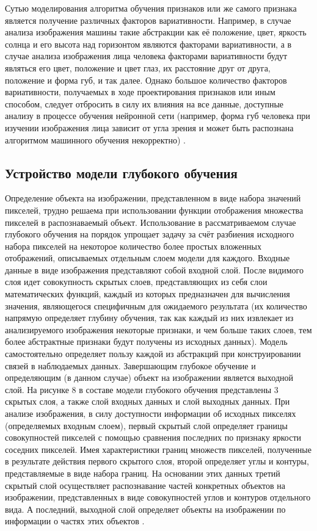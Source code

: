 \documentclass[bachelor, och, coursework]{SCWorks}
\begin{document}
        Сутью моделирования алгоритма обучения признаков или же самого признака является получение различных факторов вариативности. Например, в случае анализа изображения машины такие абстракции как её положение, цвет, яркость солнца и его высота над горизонтом являются факторами вариативности, а в случае анализа изображения лица человека факторами вариативности будут являться его цвет, положение и цвет глаз, их расстояние друг от друга, положение и форма губ, и так далее. Однако большое количество факторов вариативности, получаемых в ходе проектирования признаков или иным способом, следует отбросить в силу их влияния на все данные, доступные анализу в процессе обучения нейронной сети (например, форма губ человека при изучении изображения лица зависит от угла зрения и может быть распознана алгоритмом машинного обучения некорректно) \cite{Gud2}.

    \subsection{Устройство модели глубокого обучения}

        Определение объекта на изображении, представленном в виде набора значений пикселей, трудно решаема при использовании функции отображения множества пикселей в распознаваемый объект. Использование в рассматриваемом случае глубокого обучения на порядок упрощает задачу за счёт разбиения исходного набора пикселей на некоторое количество более простых вложенных отображений, описываемых отдельным слоем модели для каждого. Входные данные в виде изображения представляют собой входной слой. После видимого слоя идет совокупность скрытых слоев, представляющих из себя слои математических функций, каждый из которых предназначен для вычисления значения, являющегося специфичным для ожидаемого результата (их количество напрямую определяет глубину обучения, так как каждый из них извлекает из анализируемого изображения некоторые признаки, и чем больше таких слоев, тем более абстрактные признаки будут получены из исходных данных). Модель самостоятельно определяет пользу каждой из абстракций при конструировании связей в наблюдаемых данных. Завершающим глубокое обучение и определяющим (в данном случае) объект на изображении является выходной слой. На рисунке 8 в составе модели глубокого обучения представлены 3 скрытых слоя, а также слой входных данных и слой выходных данных. При анализе изображения, в силу доступности информации об исходных пикселях (определяемых входным слоем), первый скрытый слой определяет границы совокупностей пикселей с помощью сравнения последних по признаку яркости соседних пикселей. Имея характеристики границ множеств пикселей, полученные в результате действия первого скрытого слоя, второй определяет углы и контуры, представляемые в виде набора границ. На основании этих данных третий скрытый слой осуществляет распознавание частей конкретных объектов на изображении, представленных в виде совокупностей углов и контуров отдельного вида. А последний, выходной слой определяет объекты на изображении по информации о частях этих объектов \cite{Gud}.
\end{document}
